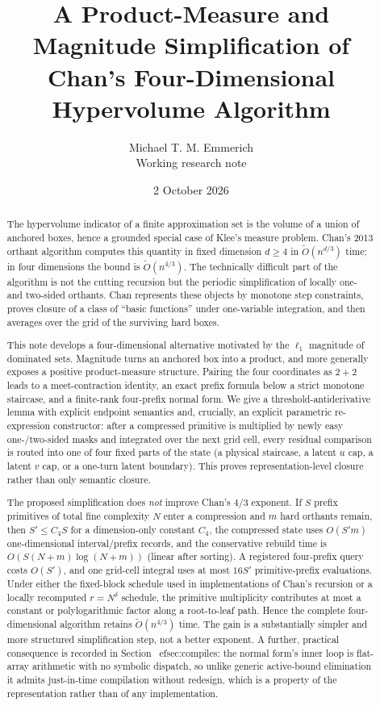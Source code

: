 \documentclass[12pt,a4paper]{article}
\title{A Product-Measure and Magnitude Simplification of\\Chan's Four-Dimensional Hypervolume Algorithm}
\author{Michael T. M. Emmerich\\\small Working research note}
\date{2 October 2026}
\theoremstyle{definition}
\newcommand{\1}{\mathbf 1}
\newcommand{\wtO}{\widetilde O}
\begin{document}
\maketitle

\begin{abstract}
The hypervolume indicator of a finite approximation set is the volume of a union of anchored boxes, hence a grounded special case of Klee's measure problem. Chan's 2013 orthant algorithm computes this quantity in fixed dimension $d\ge4$ in $\wtO(n^{d/3})$ time; in four dimensions the bound is $\wtO(n^{4/3})$. The technically difficult part of the algorithm is not the cutting recursion but the periodic simplification of locally one- and two-sided orthants. Chan represents these objects by monotone step constraints, proves closure of a class of ``basic functions'' under one-variable integration, and then averages over the grid of the surviving hard boxes.

This note develops a four-dimensional alternative motivated by the $\ell_1$ magnitude of dominated sets. Magnitude turns an anchored box into a product, and more generally exposes a positive product-measure structure. Pairing the four coordinates as $2+2$ leads to a meet-contraction identity, an exact prefix formula below a strict monotone staircase, and a finite-rank four-prefix normal form. We give a threshold-antiderivative lemma with explicit endpoint semantics and, crucially, an explicit parametric re-expression constructor: after a compressed primitive is multiplied by newly easy one-/two-sided masks and integrated over the next grid cell, every residual comparison is routed into one of four fixed parts of the state (a physical staircase, a latent $u$ cap, a latent $v$ cap, or a one-turn latent boundary). This proves representation-level closure rather than only semantic closure.

The proposed simplification does \emph{not} improve Chan's $4/3$ exponent. If $S$ prefix primitives of total fine complexity $N$ enter a compression and $m$ hard orthants remain, then $S'\le C_4S$ for a dimension-only constant $C_4$, the compressed state uses $O(S'm)$ one-dimensional interval/prefix records, and the conservative rebuild time is $O(S(N+m)\log(N+m))$ (linear after sorting). A registered four-prefix query costs $O(S')$, and one grid-cell integral uses at most $16S'$ primitive-prefix evaluations. Under either the fixed-block schedule used in implementations of Chan's recursion or a locally recomputed $r=N^\delta$ schedule, the primitive multiplicity contributes at most a constant or polylogarithmic factor along a root-to-leaf path. Hence the complete four-dimensional algorithm retains $\wtO(n^{4/3})$ time. The gain is a substantially simpler and more structured simplification step, not a better exponent.  A further, practical consequence is recorded in Section~
ef{sec:compiles}: the normal form's inner loop is flat-array arithmetic with no symbolic dispatch, so unlike generic active-bound elimination it admits just-in-time compilation without redesign, which is a property of the representation rather than of any implementation.
\end{abstract}
\end{document}
